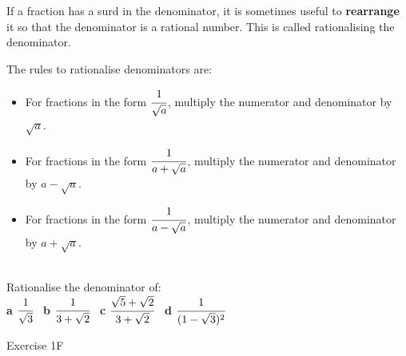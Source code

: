\documentclass[fleqn]{article}
\begin{document}
\begin{mybox2}[colbacktitle=green]{}
    If a fraction has a surd in the denominator, it is sometimes useful to \textbf{rearrange} it so that the denominator is a rational number. This is called rationalising the denominator.
    \vspace{2mm}

    \textbullet\space The rules to rationalise denominators are:\vspace{-2mm}
    \begin{itemize}
        \setlength{\itemsep}{-3pt}%
        \item For fractions in the form $\cfrac{1}{\sqrt{a}}$, multiply the numerator and denominator by $\sqrt{a}$.
        \item For fractions in the form $\cfrac{1}{a+\sqrt{a}}$, multiply the numerator and denominator by $a-\sqrt{a}$.
        \item For fractions in the form $\cfrac{1}{a-\sqrt{a}}$, multiply the numerator and denominator by $a+\sqrt{a}$.
    \end{itemize}

\end{mybox2}
\begin{examplebox}{}{}
    \\ %
    Rationalise the denominator of: \\
    \textbf{a}\hspace{2mm} $\cfrac{1}{\sqrt{3}}$                      \hspace{20mm} \
    \textbf{b}\hspace{2mm} $\cfrac{1}{3+\sqrt{2}}$                    \hspace{20mm} \
    \textbf{c}\hspace{2mm} $\cfrac{\sqrt{5}+\sqrt{2}}{3+\sqrt{2}}$    \hspace{20mm} \
    \textbf{d}\hspace{2mm} $\cfrac{1}{(1-\sqrt{3})^2}$                \hspace{20mm} \
\end{examplebox}

\vfill
\begin{practice*}{Exercise 1F}{}
\end{practice*}
\newpage
\end{document}
